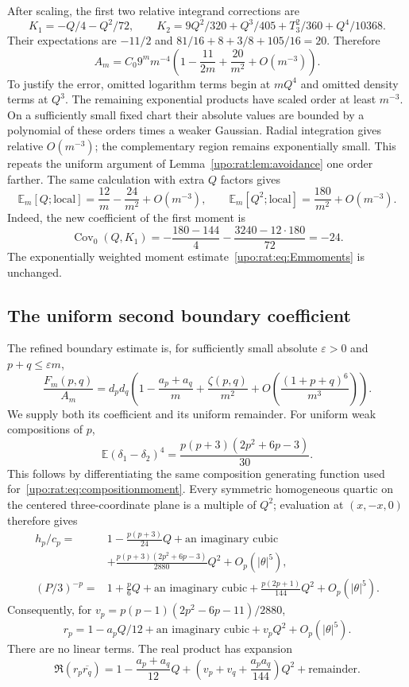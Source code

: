 \documentclass[11pt,letterpaper]{article}
\theoremstyle{remark}\newtheorem{remark}[theorem]{Remark}
\numberwithin{equation}{section}
\newcommand{\E}{\mathbb E}
\begin{document}
After scaling, the first two relative integrand corrections are
\[
K_1=-Q/4-Q^2/72,\qquad
K_2=9Q^2/320+Q^3/405+T_3^2/360+Q^4/10368.
\]
Their expectations are $-11/2$ and
$81/16+8+3/8+105/16=20$. Therefore
\begin{equation}\label{upo:rat:eq:Asecond}
A_m=C_0 9^m m^{-4}\left(1-\frac{11}{2m}+\frac{20}{m^2}
+O(m^{-3})\right).
\end{equation}
To justify the error, omitted logarithm terms begin at $mQ^4$ and omitted
density terms at $Q^3$. The remaining exponential products have scaled
order at least $m^{-3}$. On a sufficiently small fixed chart their
absolute values are bounded by a polynomial of these orders times a
weaker Gaussian. Radial integration gives relative $O(m^{-3})$;
the complementary region remains exponentially small. This repeats the
uniform argument of Lemma~\ref{upo:rat:lem:avoidance} one order farther.
The same calculation with extra $Q$ factors gives
\begin{equation}\label{upo:rat:eq:momentssecond}
\E_m[Q;\mathrm{local}]=\frac{12}{m}-\frac{24}{m^2}+O(m^{-3}),
\qquad
\E_m[Q^2;\mathrm{local}]=\frac{180}{m^2}+O(m^{-3}).
\end{equation}
Indeed, the new coefficient of the first moment is
\[
\operatorname{Cov}_0(Q,K_1)
=-\frac{180-144}{4}-\frac{3240-12\cdot180}{72}=-24.
\]
The exponentially weighted moment estimate~\eqref{upo:rat:eq:Emmoments} is
unchanged.

\subsection{The uniform second boundary coefficient}
The refined boundary estimate is, for sufficiently small absolute
$\varepsilon>0$ and $p+q\le\varepsilon m$,
\begin{equation}\label{upo:rat:eq:Fsecond}
\frac{F_m(p,q)}{A_m}=d_pd_q
\left(1-\frac{a_p+a_q}{m}+\frac{\zeta(p,q)}{m^2}
+O\left(\frac{(1+p+q)^6}{m^3}\right)\right).
\end{equation}
We supply both its coefficient and its uniform remainder.
For uniform weak compositions of $p$,
\[
\E(\delta_1-\delta_2)^4
=\frac{p(p+3)(2p^2+6p-3)}{30}.
\]
This follows by differentiating the same composition generating function
used for~\eqref{upo:rat:eq:compositionmoment}. Every symmetric homogeneous
quartic on the centered three-coordinate plane is a multiple of $Q^2$;
evaluation at $(x,-x,0)$ therefore gives
\begin{align*}
h_p/c_p={}&1-\frac{p(p+3)}{24}Q+\text{an imaginary cubic}\\
&+\frac{p(p+3)(2p^2+6p-3)}{2880}Q^2+O_p(|\theta|^5),\\
(P/3)^{-p}={}&1+\frac p6Q+\text{an imaginary cubic}
+\frac{p(2p+1)}{144}Q^2+O_p(|\theta|^5).
\end{align*}
Consequently, for $v_p=p(p-1)(2p^2-6p-11)/2880$,
\[
r_p=1-a_pQ/12+\text{an imaginary cubic}+v_pQ^2+O_p(|\theta|^5).
\]
There are no linear terms. The real product has expansion
\begin{equation}\label{upo:rat:eq:rquartic}
\Re(r_p\overline{r_q})=1-\frac{a_p+a_q}{12}Q
+\left(v_p+v_q+\frac{a_pa_q}{144}\right)Q^2
+\text{remainder}.
\end{equation}
\end{document}
